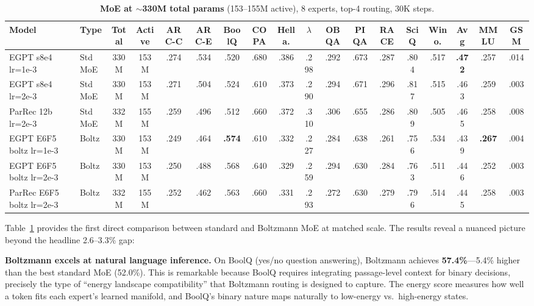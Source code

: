 \documentclass[oneside]{article}
\begin{document}
\begin{table}[t]
\centering
\caption{\textbf{MoE at $\sim$330M total params} (153--155M active), 8 experts, top-4 routing, 30K steps.}
\label{tab:moe_330m}
\begin{adjustbox}{max width=\textwidth}
\begin{tabular}{l|l|cc|ccccccccccc|c|cc}
\toprule
\textbf{Model} & \textbf{Type} & \textbf{Total} & \textbf{Active} & \textbf{ARC-C} & \textbf{ARC-E} & \textbf{BoolQ} & \textbf{COPA} & \textbf{Hella.} & \textbf{$\lambda$} & \textbf{OBQA} & \textbf{PIQA} & \textbf{RACE} & \textbf{SciQ} & \textbf{Wino.} & \textbf{Avg} & \textbf{MMLU} & \textbf{GSM} \\
\midrule
EGPT s8e4 lr=1e-3       & Std MoE   & 330M & 153M & .274 & .534 & .520 & .680 & .386 & .298 & .292 & .673 & .287 & .804 & .517 & \textbf{.472} & .257 & .014 \\
EGPT s8e4 lr=2e-3       & Std MoE   & 330M & 153M & .271 & .504 & .524 & .610 & .373 & .290 & .294 & .671 & .296 & .817 & .515 & .463 & .259 & .003 \\
ParRec 12b lr=2e-3      & Std MoE   & 332M & 155M & .259 & .496 & .512 & .660 & .372 & .310 & .306 & .655 & .286 & .809 & .505 & .465 & .258 & .008 \\
\midrule
EGPT E6F5 boltz lr=1e-3 & Boltz     & 330M & 153M & .249 & .464 & \textbf{.574} & .610 & .332 & .227 & .284 & .638 & .261 & .756 & .534 & .439 & \textbf{.267} & .004 \\
EGPT E6F5 boltz lr=2e-3 & Boltz     & 330M & 153M & .250 & .488 & .568 & .640 & .329 & .259 & .294 & .630 & .284 & .763 & .511 & .446 & .252 & .003 \\
ParRec E6F5 boltz lr=2e-3 & Boltz   & 332M & 155M & .252 & .462 & .563 & .660 & .331 & .293 & .272 & .630 & .279 & .796 & .514 & .445 & .258 & .003 \\
\bottomrule
\end{tabular}
\end{adjustbox}
\end{table}

Table~\ref{tab:moe_330m} provides the first direct comparison between standard and Boltzmann MoE at matched scale. The results reveal a nuanced picture beyond the headline 2.6--3.3\% gap:

\textbf{Boltzmann excels at natural language inference.} On BoolQ (yes/no question answering), Boltzmann achieves \textbf{57.4\%}---5.4\% higher than the best standard MoE (52.0\%). This is remarkable because BoolQ requires integrating passage-level context for binary decisions, precisely the type of ``energy landscape compatibility'' that Boltzmann routing is designed to capture. The energy score measures how well a token fits each expert's learned manifold, and BoolQ's binary nature maps naturally to low-energy vs.\ high-energy states.
\end{document}
